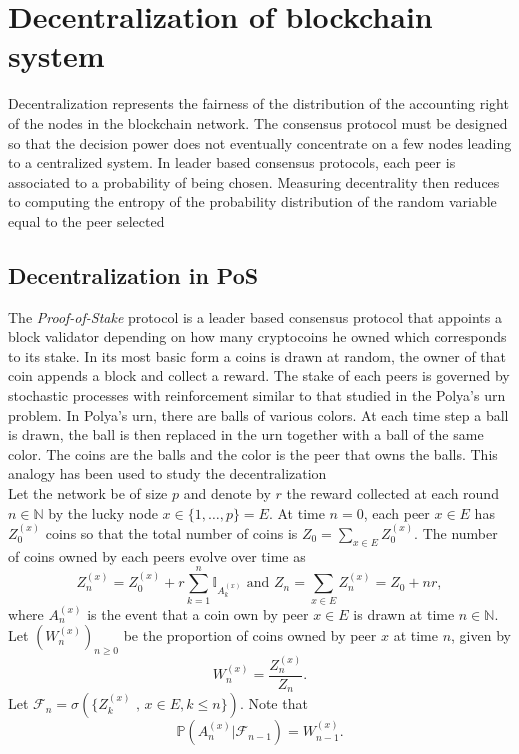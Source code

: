 \chapter{Decentralization of blockchain system}\label{chap:decentralization}
Decentralization represents the fairness of the distribution of the accounting right of the nodes in the blockchain network. The consensus protocol must be designed so that the decision power does not eventually concentrate on a few nodes leading to a centralized system. In leader based consensus protocols, each peer is associated to a probability of being chosen. Measuring decentrality then reduces to computing the entropy of the probability distribution of the random variable equal to the peer selected  \\


\section{Decentralization in PoS}\label{sec:decentralization_pos}
The \textit{Proof-of-Stake} protocol is a leader based consensus protocol that appoints a block validator depending on how many cryptocoins he owned which corresponds to its stake. In its most basic form a coins is drawn at random, the owner of that coin appends a block and collect a reward. The stake of each peers is governed by stochastic processes with reinforcement similar to that studied in the Polya's urn problem. In Polya's urn, there are balls of various colors. At each time step a ball is drawn, the ball is then replaced in the urn together with a ball of the same color. The coins are the balls and the color is the peer that owns the balls. This analogy has been used to study the decentralization\\

\noindent Let the network be of size $p$ and denote by $r$ the reward collected at each round $n\in\mathbb{N}$ by the lucky node $x\in \{1, \ldots, p\} = E$. At time $n=0$, each peer $x\in E$ has $Z^{(x)}_0$ coins so that the total number of coins is $Z_0 = \sum_{x\in E}Z^{(x)}_0$. The number of coins owned by each peers evolve over time as
$$
Z^{(x)}_n = Z^{(x)}_0 + r\sum_{k = 1}^n\mathbb{I}_{A_{k}^{(x)}}\text{ and }Z_n = \sum_{x\in E}Z^{(x)}_n = Z_0 + nr,    
$$
where $A_{n}^{(x)}$ is the event that a coin own by peer $x\in E$ is drawn at time $n\in\mathbb{N}$. Let $(W_n^{(x)})_{n\geq0}$ be the proportion of coins owned by peer $x$ at time $n$, given by 
$$
W_n^{(x)} = \frac{Z^{(x)}_n}{Z_n}. 
$$
Let $\mathcal{F}_n = \sigma(\{Z_k^{(x)}\text{ , }x\in E, k\leq n\})$. Note that 
$$
\mathbb{P}\left(A_{n}^{(x)}|\mathcal{F}_{n-1}\right) = W_{n-1}^{(x)}.
$$
